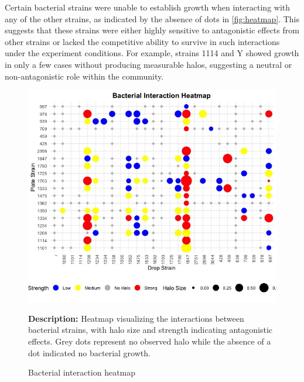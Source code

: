 Certain bacterial strains were unable to establish growth when interacting with any of the other strains, as indicated by the absence of dots in \autoref{fig:heatmap}. This suggests that these strains were either highly sensitive to antagonistic effects from other strains or lacked the competitive ability to survive in such interactions under the experiment conditions. 
For example, strains 1114 and Y showed growth in only a few cases without producing measurable halos, suggesting a neutral or non-antagonistic role within the community.
\begin{figure}[H]
    \centering
    \raggedright
    \includegraphics[width=\linewidth]{Figures/Heatmap.jpeg}
    \caption{Bacterial interaction heatmap}
    \medskip
    \textbf{Description:} Heatmap visualizing the interactions between bacterial strains, with halo size and strength indicating antagonistic effects. Grey dots represent no observed halo while the absence of a dot indicated no bacterial growth.
    \label{fig:heatmap}
\end{figure}

